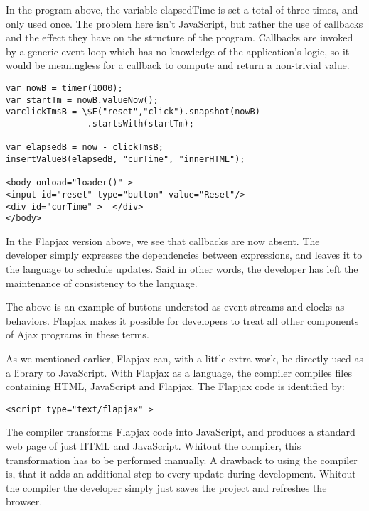 In the program above, the variable elapsedTime is set a total of three times, and only used once. The problem here isn't JavaScript, but rather the use of callbacks and the effect they have on the structure of the program. Callbacks are invoked by a generic event loop which has no knowledge of the application's logic, so it would be meaningless for a callback to compute and return a non-trivial value.

\begin{verbatim}
var nowB = timer(1000);
var startTm = nowB.valueNow();
varclickTmsB = \$E("reset","click").snapshot(nowB)
				.startsWith(startTm);

var elapsedB = now - clickTmsB;
insertValueB(elapsedB, "curTime", "innerHTML");

<body onload="loader()" >
<input id="reset" type="button" value="Reset"/>
<div id="curTime" >  </div>
</body>
\end{verbatim}

In the Flapjax version above, we see that callbacks are now absent. The developer simply expresses the dependencies between expressions, and leaves it to the language to schedule updates. Said in other words, the developer has left the maintenance of consistency to the language.

The above is an example of buttons understod as event streams and clocks as behaviors. Flapjax makes it possible for developers to treat all other components of Ajax programs in these terms.

As we mentioned earlier, Flapjax can, with a little extra work, be directly used as a library to JavaScript. With Flapjax as a language, the compiler compiles files containing HTML, JavaScript and Flapjax. The Flapjax code is identified by:

\begin{verbatim}
<script type="text/flapjax" >
\end{verbatim}

The compiler transforms Flapjax code into JavaScript, and produces a standard web page of just HTML and JavaScript. Whitout the compiler, this transformation has to be performed manually. A drawback to using the compiler is, that it adds an additional step to every update during development. Whitout the compiler the developer simply just saves the project and refreshes the browser.
